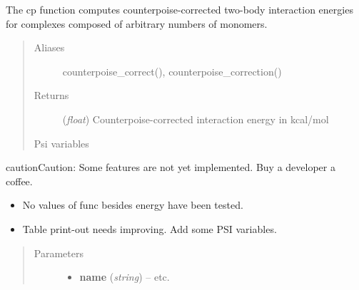 \documentclass[letterpaper,10pt,english]{sphinxmanual}
\begin{document}
\begin{fulllineitems}
\label{index:wrappers.cp}
The cp function computes counterpoise-corrected two-body interaction energies
for complexes composed of arbitrary numbers of monomers.
\begin{quote}\begin{description}
\item[{Aliases }] \leavevmode
counterpoise\_correct(), counterpoise\_correction()

\item[{Returns}] \leavevmode
(\emph{float}) Counterpoise-corrected interaction energy in kcal/mol

\item[{Psi variables}] \leavevmode
\end{description}\end{quote}

\begin{fulllineitems}
\label{index:envvar-CP-CORRECTED2-BODYINTERACTIONENERGY}\label{index:envvar-UNCP-CORRECTED2-BODYINTERACTIONENERGY}
\end{fulllineitems}


\begin{notice}{caution}{Caution:}
Some features are not yet implemented. Buy a developer a coffee.
\begin{itemize}
\item {} 
No values of func besides energy have been tested.

\item {} 
Table print-out needs improving. Add some PSI variables.

\end{itemize}
\end{notice}
\begin{quote}\begin{description}
\item[{Parameters}] \leavevmode\begin{itemize}
\item {} 
\textbf{name} (\emph{string}) -- 
 \textbar{}\textbar{}  \textbar{}\textbar{} etc.


\end{itemize}
\end{description}
\end{quote}
\end{fulllineitems}
\end{document}
